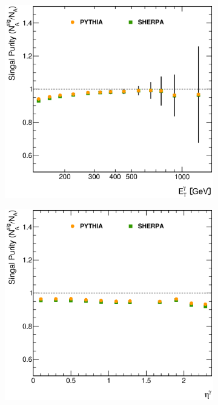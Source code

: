 \documentclass[12pt, twoside]{article}
\numberwithin{equation}{section}
\numberwithin{figure}{section}
\newenvironment{changemargin}[2]{%
\begin{list}{}{%
\setlength{\topsep}{0pt}%
\setlength{\leftmargin}{#1}%
\setlength{\rightmargin}{#2}%
\setlength{\listparindent}{\parindent}%
\setlength{\itemindent}{\parindent}%
\setlength{\parsep}{\parskip}%
}%
\item[]}{\end{list}}
\begin{document}
\begin{figure}
    \centering
    \checkoddpage
    \ifoddpage
        \begin{changemargin}{-1.0cm}{-0.75cm}
    \else
        \begin{changemargin}{-0.75cm}{-1.0cm}
    \fi
        \begin{subfigure}[b]{0.37\textwidth}
            \includegraphics[width=\textwidth]{./images/SignalPurity/SIG_PUR-101.eps}
            \subcaption{}
            \label{fig:PurityEtPhoton}
        \end{subfigure}
        \begin{subfigure}[b]{0.37\textwidth}
            \includegraphics[width=\textwidth]{./images/SignalPurity/SIG_PUR-102.eps}

\end{subfigure}
\end{changemargin}
\end{changemargin}
\end{figure}
\end{document}
